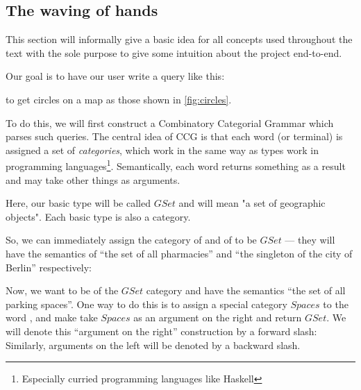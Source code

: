 \documentclass[main.tex]{subfiles}
\begin{document}
\subsection{The waving of hands}
This section will informally give a basic idea for all concepts used throughout the text
with the sole purpose to give some intuition about the project end-to-end.

Our goal is to have our user write a query like this:
\begin{center}
\end{center}
to get circles on a map as those shown in \cref{fig:circles}.


To do this, we will first construct a Combinatory Categorial Grammar which parses
such queries. The central idea of CCG is that each word (or terminal) is assigned
a set of
\emph{categories}, which work in the same way as types work in programming
languages\footnote{Especially curried programming languages like Haskell}.
Semantically, each word returns something as a result and may take other things as arguments.

Here, our basic type will be called $GSet$ and will mean "a set of geographic
objects". Each basic type is also a category.

So, we can immediately assign the category of  and of
 to be $GSet$ --- they will have the semantics of ``the set of all
pharmacies'' and ``the singleton of the city of Berlin'' respectively:

Now, we want  to be of the $GSet$ category and have the semantics
``the set of all parking spaces''. One way to do this is to assign a special
category $Spaces$ to the word , and make  take
$Spaces$ as an argument on the right and return $GSet$. We will denote this
``argument on the right'' construction by a forward slash:
Similarly, arguments on the left will be denoted by a backward slash.
\end{document}
